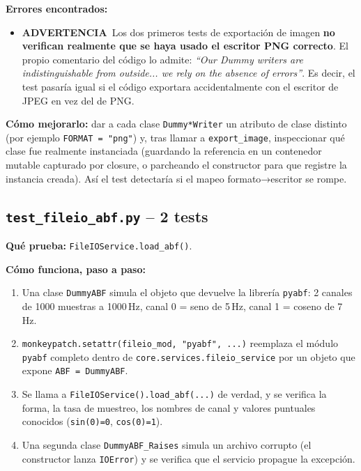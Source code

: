 \documentclass[11pt,a4paper]{article}
\newcommand{\warnmark}{\textcolor{advertencia}{\textbf{ADVERTENCIA}}}
\begin{document}
\textbf{Errores encontrados:}
\begin{itemize}
  \item \warnmark\ Los dos primeros tests de exportación de imagen \textbf{no verifican realmente que se
        haya usado el escritor PNG correcto}. El propio comentario del código lo admite:
        \textit{``Our Dummy writers are indistinguishable from outside... we rely on the absence of
        errors''}. Es decir, el test pasaría igual si el código exportara accidentalmente con el escritor de
        JPEG en vez del de PNG.
\end{itemize}

\textbf{Cómo mejorarlo:} dar a cada clase \texttt{Dummy*Writer} un atributo de clase distinto (por ejemplo
\texttt{FORMAT = "png"}) y, tras llamar a \texttt{export\_\allowbreak image}, inspeccionar qué clase fue realmente
instanciada (guardando la referencia en un contenedor mutable capturado por closure, o parcheando el
constructor para que registre la instancia creada). Así el test detectaría si el mapeo
formato→escritor se rompe.

\subsection{\texttt{test\_\allowbreak fileio\_\allowbreak abf.py} -- 2 tests}

\textbf{Qué prueba:} \texttt{FileIOService.load\_\allowbreak abf()}.

\textbf{Cómo funciona, paso a paso:}
\begin{enumerate}
  \item Una clase \texttt{DummyABF} simula el objeto que devuelve la librería \texttt{pyabf}: 2 canales de
        1000 muestras a 1000\,Hz, canal 0 = seno de 5\,Hz, canal 1 = coseno de 7\,Hz.
  \item \texttt{monkeypatch.setattr(fileio\_\allowbreak mod, "pyabf", ...)} reemplaza el módulo \texttt{pyabf} completo
        dentro de \texttt{core.services.fileio\_\allowbreak service} por un objeto que expone \texttt{ABF = DummyABF}.
  \item Se llama a \texttt{FileIOService().load\_\allowbreak abf(...)} de verdad, y se verifica la forma, la tasa de
        muestreo, los nombres de canal y valores puntuales conocidos (\texttt{sin(0)=0}, \texttt{cos(0)=1}).
  \item Una segunda clase \texttt{DummyABF\_\allowbreak Raises} simula un archivo corrupto (el constructor lanza
        \texttt{IOError}) y se verifica que el servicio propague la excepción.
\end{enumerate}
\end{document}
